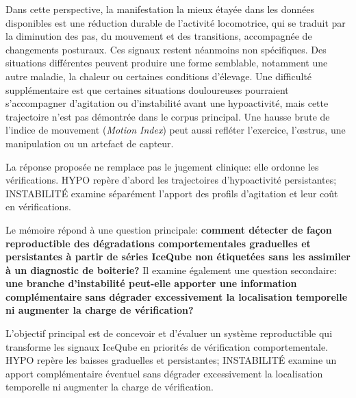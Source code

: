 \begin{introduction}
Dans cette perspective, la manifestation la mieux étayée dans les données disponibles est une
réduction durable de l'activité locomotrice, qui se traduit par la diminution des pas, du
mouvement et des
transitions, accompagnée de changements posturaux. Ces signaux restent néanmoins non
spécifiques. Des situations différentes peuvent produire une forme semblable, notamment une
autre maladie, la chaleur ou certaines conditions d'élevage. Une difficulté supplémentaire est
que certaines situations douloureuses
pourraient s'accompagner d'agitation ou d'instabilité avant une hypoactivité, mais cette
trajectoire n'est pas démontrée dans le corpus principal. Une hausse brute de l'indice de
mouvement (\textit{Motion Index}) peut aussi refléter l'exercice, l'œstrus, une manipulation ou
un artefact de capteur.

La réponse proposée ne remplace pas le jugement clinique: elle ordonne les vérifications. HYPO
repère d'abord les trajectoires d'hypoactivité persistantes; INSTABILITÉ examine séparément
l'apport des profils d'agitation et leur coût en vérifications.

Le mémoire répond à une question principale: \textbf{comment détecter de façon reproductible
des dégradations comportementales graduelles et persistantes à partir de séries IceQube non
étiquetées sans les assimiler à un diagnostic de boiterie?} Il examine également une question
secondaire: \textbf{une branche d'instabilité peut-elle apporter une information complémentaire
sans dégrader excessivement la localisation temporelle ni augmenter la charge de vérification?}

L'objectif principal est de concevoir et d'évaluer un système reproductible qui transforme les
signaux IceQube en priorités de vérification comportementale. HYPO repère les baisses graduelles
et persistantes; INSTABILITÉ examine un apport complémentaire éventuel sans dégrader
excessivement la localisation temporelle ni augmenter la charge de vérification.


\end{introduction}
